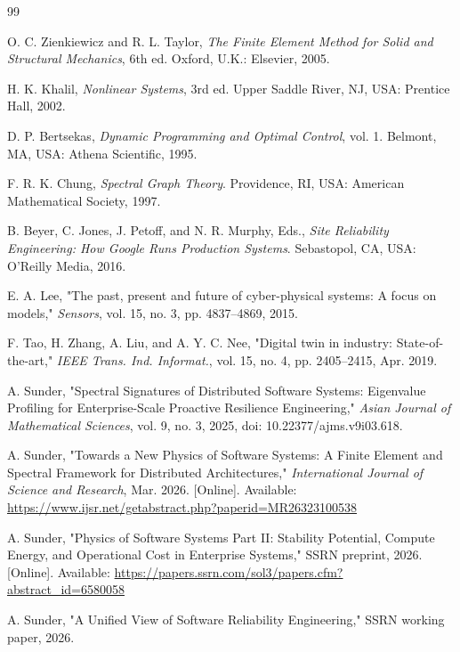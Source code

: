 \documentclass[conference]{IEEEtran}
\begin{document}
\begin{thebibliography}{99}

O. C. Zienkiewicz and R. L. Taylor, \emph{The Finite Element Method for Solid and Structural Mechanics}, 6th ed. Oxford, U.K.: Elsevier, 2005.

H. K. Khalil, \emph{Nonlinear Systems}, 3rd ed. Upper Saddle River, NJ, USA: Prentice Hall, 2002.

D. P. Bertsekas, \emph{Dynamic Programming and Optimal Control}, vol. 1. Belmont, MA, USA: Athena Scientific, 1995.

F. R. K. Chung, \emph{Spectral Graph Theory}. Providence, RI, USA: American Mathematical Society, 1997.

B. Beyer, C. Jones, J. Petoff, and N. R. Murphy, Eds., \emph{Site Reliability Engineering: How Google Runs Production Systems}. Sebastopol, CA, USA: O'Reilly Media, 2016.

E. A. Lee, "The past, present and future of cyber-physical systems: A focus on models," \emph{Sensors}, vol. 15, no. 3, pp. 4837--4869, 2015.

F. Tao, H. Zhang, A. Liu, and A. Y. C. Nee, "Digital twin in industry: State-of-the-art," \emph{IEEE Trans. Ind. Informat.}, vol. 15, no. 4, pp. 2405--2415, Apr. 2019.

A. Sunder, "Spectral Signatures of Distributed Software Systems: Eigenvalue Profiling for Enterprise-Scale Proactive Resilience Engineering," \emph{Asian Journal of Mathematical Sciences}, vol. 9, no. 3, 2025, doi: 10.22377/ajms.v9i03.618.

A. Sunder, "Towards a New Physics of Software Systems: A Finite Element and Spectral Framework for Distributed Architectures," \emph{International Journal of Science and Research}, Mar. 2026. [Online]. Available: \url{https://www.ijsr.net/getabstract.php?paperid=MR26323100538}

A. Sunder, "Physics of Software Systems Part II: Stability Potential, Compute Energy, and Operational Cost in Enterprise Systems," SSRN preprint, 2026. [Online]. Available: \url{https://papers.ssrn.com/sol3/papers.cfm?abstract_id=6580058}

A. Sunder, "A Unified View of Software Reliability Engineering," SSRN working paper, 2026.

\end{thebibliography}
\end{document}

